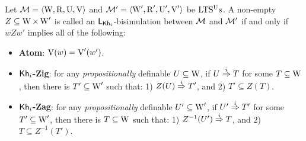 \begin{definition}\label{def:bisim-khi}
Let $\mathcal{M} = \langle \operatorname{W},\operatorname{R},\operatorname{U},\operatorname{V} \rangle$ and $\mathcal{M}' = \langle \operatorname{W}',\operatorname{R}',\operatorname{U}',\operatorname{V}' \rangle$ be ${\textup{LTS$^\text{\textup{U}}$}}s$.
%
A non-empty $Z \subseteq \operatorname{W} \times \operatorname{W}'$ is called an $\mathsf{L}_{{\sf Kh}_i}$-bisimulation between $\mathcal{M}$ and $\mathcal{M}'$ if and only if $wZw'$ implies all of the following:
\begin{itemize} 
    \item \textbf{Atom}: $\operatorname{V}(w)=\operatorname{V}'(w')$.

    \item \textbf{${\sf Kh}_i$-Zig}: for any \emph{propositionally} definable $U \subseteq \operatorname{W}$, if $U \stackrel{i}{\Rightarrow} T$ for some $T \subseteq \operatorname{W}$, then there is $T' \subseteq \operatorname{W}'$ such that: 
        1) $Z(U) \stackrel{i}{\Rightarrow} T'$, and
        2) $T' \subseteq Z(T)$.

    \item \textbf{${\sf Kh}_i$-Zag}: %
    for any \emph{propositionally} definable $U' \subseteq \operatorname{W}'$, if $U' \stackrel{i}{\Rightarrow} T'$ for some $T' \subseteq \operatorname{W}'$, then there is $T \subseteq \operatorname{W}$ such that: 
        1) $Z^{-1}(U') \stackrel{i}{\Rightarrow} T$, and
        2) $T \subseteq Z^{-1}(T')$.


\end{itemize}
\end{definition}
